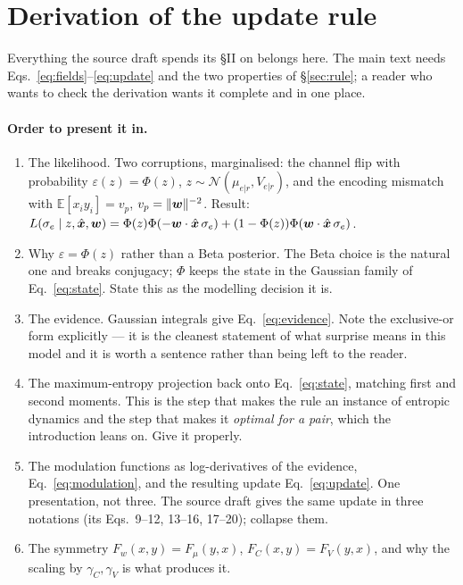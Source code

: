 \section{Derivation of the update rule}
\label{app:derivation}

Everything the source draft spends its \S II on belongs here. The main text needs
Eqs.~\ref{eq:fields}--\ref{eq:update} and the two properties of
\S\ref{sec:rule}; a reader who wants to check the derivation wants it complete and
in one place.

\paragraph{Order to present it in.}
\begin{enumerate}
  \item The likelihood. Two corruptions, marginalised: the channel flip with
    probability $\varepsilon(z) = \Phi(z)$, $z \sim \mathcal{N}(\mu_{e|r}, V_{e|r})$,
    and the encoding mismatch with $\mathbb{E}[x_i y_i] = v_p$, $v_p = \|\bm{w}\|^{-2}$.
    Result: $L(\sigma_e \mid z, \hat{\bm{x}}, \bm{w}) = \Phi(z)\Phi(-\bm{w}\cdot\hat{\bm{x}}\,\sigma_e)
    + (1 - \Phi(z))\Phi(\bm{w}\cdot\hat{\bm{x}}\,\sigma_e)$.
  \item Why $\varepsilon = \Phi(z)$ rather than a Beta posterior. The Beta choice
    is the natural one and breaks conjugacy; $\Phi$ keeps the state in the Gaussian
    family of Eq.~\ref{eq:state}. State this as the modelling decision it is.
  \item The evidence. Gaussian integrals give Eq.~\ref{eq:evidence}. Note the
    exclusive-or form explicitly --- it is the cleanest statement of what surprise
    means in this model and it is worth a sentence rather than being left to the
    reader.
  \item The maximum-entropy projection back onto Eq.~\ref{eq:state}, matching first
    and second moments. This is the step that makes the rule an instance of
    entropic dynamics and the step that makes it \emph{optimal for a pair}, which
    the introduction leans on. Give it properly.
  \item The modulation functions as log-derivatives of the evidence,
    Eq.~\ref{eq:modulation}, and the resulting update Eq.~\ref{eq:update}. One
    presentation, not three. The source draft gives the same update in three
    notations (its Eqs.~9--12, 13--16, 17--20); collapse them.
  \item The symmetry $F_w(x,y) = F_\mu(y,x)$, $F_C(x,y) = F_V(y,x)$, and why the
    scaling by $\gamma_C, \gamma_V$ is what produces it.
\end{enumerate}

